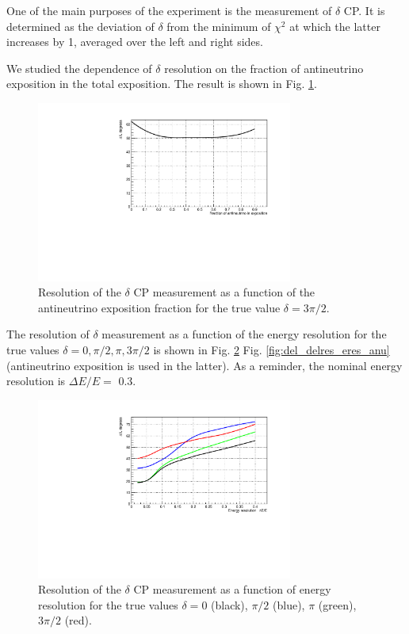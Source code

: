 \documentclass[prd,showpacs,groupedaddress,superscriptaddress,amsmath,amssymb]{revtex4-2} %
\begin{document}
 One of the main purposes of the experiment is the measurement of $\delta$ CP. It is determined as the deviation of $\delta$ from the minimum
of $\chi^2$ at which the latter increases by 1, averaged over the left and right sides.

 We studied the dependence of $\delta$ resolution on the fraction of antineutrino exposition in the total exposition. The result
is shown in Fig. \ref{fig:del_delres_anufrac}.

\begin{figure}[h]
\begin{center}
\includegraphics[width=0.75\textwidth]{del_delres_anufrac.pdf}
\caption {Resolution of the $\delta$ CP measurement as a function of the antineutrino exposition fraction for the true value $\delta = 3\pi/2$.
\label{fig:del_delres_anufrac}}
\end{center}
\end{figure}

 The resolution of $\delta$ measurement as a function of the energy resolution for the true values $\delta = 0, \pi/2, \pi, 3\pi/2$ is shown
in Fig. \ref{fig:del_delres_eres} Fig. \ref{fig:del_delres_eres_anu} (antineutrino exposition is used in the latter). As a reminder, the
nominal energy resolution is $\Delta E / E =$ 0.3.

\begin{figure}[h]
\begin{center}
\includegraphics[width=0.75\textwidth]{del_delres_eres.pdf}
\caption {Resolution of the $\delta$ CP measurement as a function of energy resolution for the true values $\delta = 0$ (black), $\pi/2$ (blue),
$\pi$ (green), $3\pi/2$ (red).
\label{fig:del_delres_eres}}
\end{center}
\end{figure}
\end{document}
